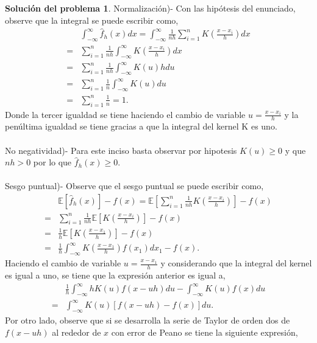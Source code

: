 \documentclass[twoside,12pt]{article}
\theoremstyle{definition}
\newtheorem{soln}{Solución del problema}
\begin{document}
\newpage
\begin{soln}
 Normalización)- Con las hipótesis del enunciado, observe que la integral se puede escribir como, 
    $$\begin{aligned} & \int_{-\infty}^{\infty} \hat{f}_h(x) d x=\int_{-\infty}^{\infty} \frac{1}{nh} \sum_{i=1}^n K\left(\frac{x-x_i}{h}\right) d x \\ = & \sum_{i=1}^n \frac{1}{n h} \int_{-\infty}^{\infty} K\left(\frac{x-x_i}{h}\right) d x \\ = & \sum_{i=1}^n \frac{1}{n h} \int_{-\infty}^{\infty} K(u) h d u \\ = & \sum_{i=1}^n \frac{1}{n} \int_{-\infty}^{\infty} K(u) d u \\ = & \sum_{i=1}^n \frac{1}{n}=1.\end{aligned}$$
    Donde la tercer igualdad se tiene haciendo el cambio de variable $u=\frac{x-x_i}{h}$ y la penúltima igualdad se tiene gracias a que la integral del kernel K es uno.
    \\ \\
    No negatividad)- Para este inciso basta observar por hipotesis $K(u) \geq 0$ y que $nh>0$ por lo que $\hat{f}_h(x)\geq 0.$
    \\ \\ 
    Sesgo puntual)- Observe que el sesgo puntual se puede escribir como, 
$$\begin{aligned} & \mathbb{E}\left[\hat{f}_h(x)\right]-f(x)=\mathbb{E}\left[\sum_{i=1}^n \frac{1}{n h} K\left(\frac{x-x_i}{h}\right)\right]-f(x) \\ = & \sum_{i=1}^n \frac{1}{n h} \mathbb{E}\left[K\left(\frac{x-x_i}{h}\right)\right]-f(x) \\ = & \frac{1}{h} \mathbb{E}\left[K\left(\frac{x-x_1}{h}\right)\right]-f(x) \\ = & \frac{1}{h} \int_{-\infty}^{\infty} K\left(\frac{x-x_1}{h}\right) f\left(x_1\right) d x_1-f(x).\end{aligned}$$
Haciendo el cambio de variable $u=\frac{x-x_1}{h}$ y considerando que la integral del kernel es igual a uno, se tiene que la expresión anterior es igual a, 
$$\begin{aligned} & \frac{1}{h} \int_{-\infty}^{\infty} h K(u) f(x-u h) d u-\int_{-\infty}^{\infty} K(u) f(x) d u \\ = & \int_{-\infty}^{\infty} K(u)[f(x-u h)-f(x)] d u.\end{aligned}$$
Por otro lado, observe que si se desarrolla la serie de Taylor de orden dos de $f(x-uh)$ al rededor de $x$ con error de Peano se tiene la siguiente expresión, 

\end{soln}
\end{document}
